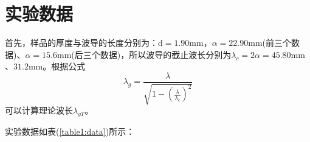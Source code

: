 \documentclass[a4paper]{article}
\begin{document}
\section{实验数据}
首先，样品的厚度与波导的长度分别为：$\text{d} = 1.90\text{mm}$，$\alpha = 22.90\text{mm}$(前三个数据)、$\alpha = 15.6\text{mm}$(后三个数据)，所以波导的截止波长分别为$\lambda_c = 2\alpha = 45.80\text{mm}$、$31.2\text{mm}$。根据公式
\begin{equation*}
	\lambda_g = \frac{\lambda}{\sqrt{1 - (\frac{\lambda}{\lambda_c})^2}}
\end{equation*}
可以计算理论波长$\lambda_{gT}$。

实验数据如表(\ref{table1:data})所示：
\end{document}
